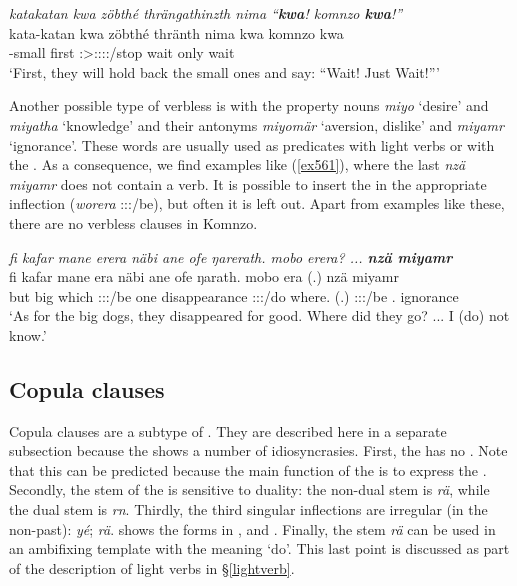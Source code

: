 \begin{exe}
 	\ex \emph{katakatan kwa zöbthé thrängathinzth nima ``\textbf{kwa}! komnzo \textbf{kwa}!''}\\
 	\gll kata-katan kwa zöbthé thränth nima kwa komnzo kwa\\
	\Redup-small {\Fut} first \Stpl:\Sbj>\Stpl:\Obj:\Irr:\Pfv:\Venit/stop {\Quot} wait only wait\\
 	\trans `First, they will hold back the small ones and say: ``Wait! Just Wait!'''\\
 	\label{ex560}
\end{exe}

Another possible type of verbless  is with the property nouns \emph{miyo} `desire' and \emph{miyatha} `knowledge' and their antonyms \emph{miyomär} `aversion, dislike' and \emph{miyamr} `ignorance'. These words are usually used as  predicates with light verbs or with the . As a consequence, we find examples like ({\ref{ex561}}), where the last  \emph{nzä miyamr} does not contain a verb. It is possible to insert the  in the appropriate inflection (\emph{worera} \Fsg:\Sbj:\Pst:\Ipfv/be), but often it is left out. Apart from examples like these, there are no verbless clauses in Komnzo.

\begin{exe}
	\ex \emph{fi kafar mane erera näbi ane ofe ŋarerath. mobo erera? ... \textbf{nzä miyamr}}\\
	\gll fi kafar mane era näbi ane ofe ŋarath. mobo era (.) nzä miyamr\\
	but big which \Stpl:\Sbj:\Pst:\Ipfv/be one {\Dem} disappearance \Stpl:\Sbj:\Pst:\Ipfv/do where.{\All} (.)  \Stpl:\Sbj:\Pst:\Ipfv/be \Fsg.{\Abs} ignorance\\
	\trans `As for the big dogs, they disappeared for good. Where did they go? ... I (do) not know.'
	\label{ex561}
\end{exe}

\subsection{Copula clauses}\label{copclause}

Copula clauses are a subtype of  . They are described here in a separate subsection because the  shows a number of idiosyncrasies. First, the  has no . Note that this can be predicted because the main function of the  is to express the  . Secondly, the stem of the  is sensitive to duality: the non-dual stem is \emph{rä}, while the dual stem is \emph{rn}. Thirdly, the third  singular inflections are irregular (in the non-past):  \emph{yé};  \emph{rä}.  shows the  forms in ,  and  . Finally, the  stem \emph{rä} can be used in an ambifixing template with the meaning `do'. This last point is discussed as part of the description of light verbs in \S\ref{lightverb}.

